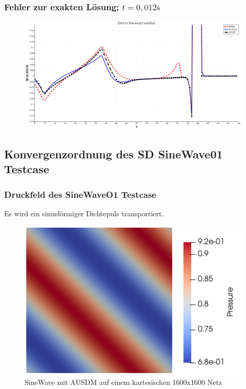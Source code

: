 \documentclass[
	11pt, %
	aspectratio=169, %
]{beamer}
\begin{document}
\begin{frame}
	\frametitle{Fehler zur exakten Lösung; $t=0,012 \mathrm{s}$}
	\begin{figure}
		\includegraphics[width=0.9\linewidth]{ErrorToExactSolution_God_Steger_AUSMD_transparent.png}
	\end{figure}
	

\end{frame}






\subsection{Konvergenzordnung des SD SineWave01 Testcase}

\begin{frame}
	\frametitle{Druckfeld des SineWaveO1 Testcase}
	Es wird ein sinusförmiger Dichtepuls transportiert.
	\begin{figure}
		\includegraphics[width=0.55\linewidth]{SineWaveO1AUSMD_1600x1600.png}
		\caption{SineWave mit AUSDM auf einem kartesischen 1600x1600 Netz}
	\end{figure}
\end{frame}
\end{document}
